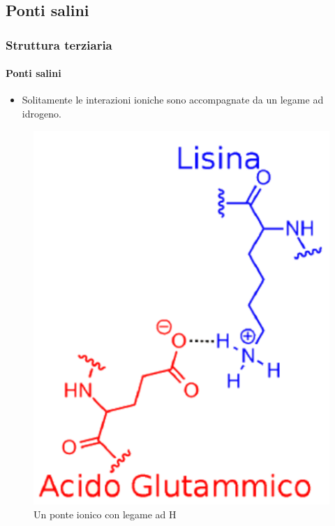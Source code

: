 \documentclass{beamer}
\begin{document}
\subsection{Ponti salini}
\begin{frame}
  \frametitle{Struttura terziaria}
  \framesubtitle{Ponti salini}
  
\begin{itemize}
  \item   Solitamente le interazioni ioniche sono accompagnate da un legame ad idrogeno.
  \end{itemize}\pause
\begin{figure}
\includegraphics[scale=0.4]{salt_bridge.pdf}\caption{Un ponte ionico con legame ad H}\label{saltbridge}
\end{figure}

\end{frame}
\end{document}
